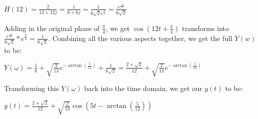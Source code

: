 \documentclass[12pt,letterpaper, onecolumn]{exam}
\begin{document}
\begin{enumerate}
        \begin{center}\begin{math}
            H(12) = \frac{2}{12 + 12j} = \frac{1}{6 + 6j} = \frac{1}{6\sqrt{2}e^{\frac{\pi}{4}}} = \frac{e^{\frac{-\pi}{4}}}{6\sqrt{2}}
        \end{math}\end{center}

        Adding in the original phase of \begin{math}\frac{\pi}{4}\end{math}, we get \begin{math}\cos{(12t + \frac{\pi}{4})}\end{math} transforms into \begin{math}\frac{e^{\frac{-\pi}{4}}}{6\sqrt{2}}*e^{\frac{\pi}{4}} = \frac{1}{6\sqrt{2}}\end{math}. Combining all the various aspects together, we get the full \begin{math}Y(w)\end{math} to be:

            \begin{center}\begin{math}
                Y(\omega) = \frac{1}{6} + \sqrt{\frac{2}{13}}e^{-\arctan{(\frac{5}{12})}} + \frac{1}{6\sqrt{2}} = \frac{2 + \sqrt{2}}{12} + \sqrt{\frac{2}{13}}e^{-\arctan{(\frac{5}{12})}}
            \end{math}\end{center}

        Transforming this \begin{math}Y(\omega)\end{math} back into the time domain, we get our \begin{math}y(t)\end{math} to be:

            \begin{center}\begin{math}
                y(t) = \frac{2 + \sqrt{2}}{12} + \sqrt{\frac{2}{13}}\cos{(5t - {\arctan{(\frac{5}{12})}})}
            \end{math}\end{center}

\end{enumerate}
\pagebreak %
\end{document}
